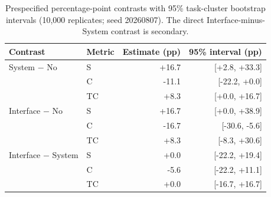 \begin{table}[t]
\caption{Prespecified percentage-point contrasts with 95\% task-cluster bootstrap intervals (10{,}000 replicates; seed 20260807). The direct Interface-minus-System contrast is secondary.}
\label{tab:v02-contrasts}
\centering
\scriptsize
\setlength{\tabcolsep}{4pt}
\begin{tabular}{llrr}
\toprule
Contrast & Metric & Estimate (pp) & 95\% interval (pp) \\
\midrule
System $-$ No & S & +16.7 & [+2.8, +33.3] \\
 & C & -11.1 & [-22.2, +0.0] \\
 & TC & +8.3 & [+0.0, +16.7] \\
\addlinespace[2pt]
Interface $-$ No & S & +16.7 & [+0.0, +38.9] \\
 & C & -16.7 & [-30.6, -5.6] \\
 & TC & +8.3 & [-8.3, +30.6] \\
\addlinespace[2pt]
Interface $-$ System & S & +0.0 & [-22.2, +19.4] \\
 & C & -5.6 & [-22.2, +11.1] \\
 & TC & +0.0 & [-16.7, +16.7] \\
\bottomrule
\end{tabular}
\end{table}
